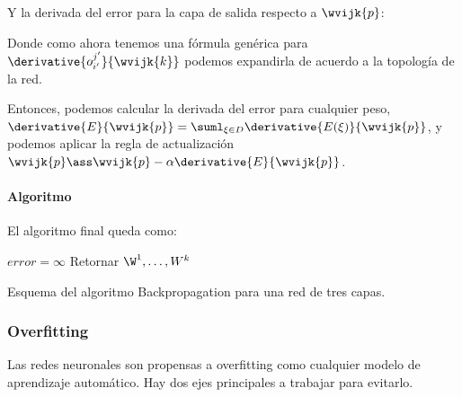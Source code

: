 
Y la derivada del error para la capa de salida respecto a $\wvijk{p}$:




Donde como ahora tenemos una fórmula genérica para $\derivative{ o_{i'}^{j'} }{\wvijk{k}}$ podemos expandirla de acuerdo a la topología de la red.

Entonces, podemos calcular la derivada del error para cualquier peso, $\derivative{E}{\wvijk{p}}= \suml_{\xi \in D} \derivative{E(\xi)}{\wvijk{p}}$, y podemos aplicar la regla de actualización $\wvijk{p} \ass\wvijk{p} - \alpha \derivative{E}{\wvijk{p}}$.
 
 
\paragraph{Algoritmo}
 
El algoritmo final queda como:


\begin{algorithm}[H]
$error=\infty$ \;
Retornar  $\W^1,\dots,W^k$ \;
\caption{Esquema del algoritmo Backpropagation para una red de tres capas.} 
\end{algorithm}


\subsubsection{Overfitting}

Las redes neuronales son propensas a overfitting como cualquier modelo de aprendizaje automático. Hay dos ejes principales a trabajar para evitarlo.

